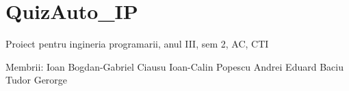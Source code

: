 \chapter{Quiz\+Auto\+\_\+\+IP}
\hypertarget{md__r_e_a_d_m_e}{}\label{md__r_e_a_d_m_e}
\label{md__r_e_a_d_m_e_autotoc_md0}%
%


Proiect pentru ingineria programarii, anul III, sem 2, AC, CTI

Membrii\+: Ioan Bogdan-\/\+Gabriel Ciausu Ioan-\/\+Calin Popescu Andrei Eduard Baciu Tudor Gerorge 